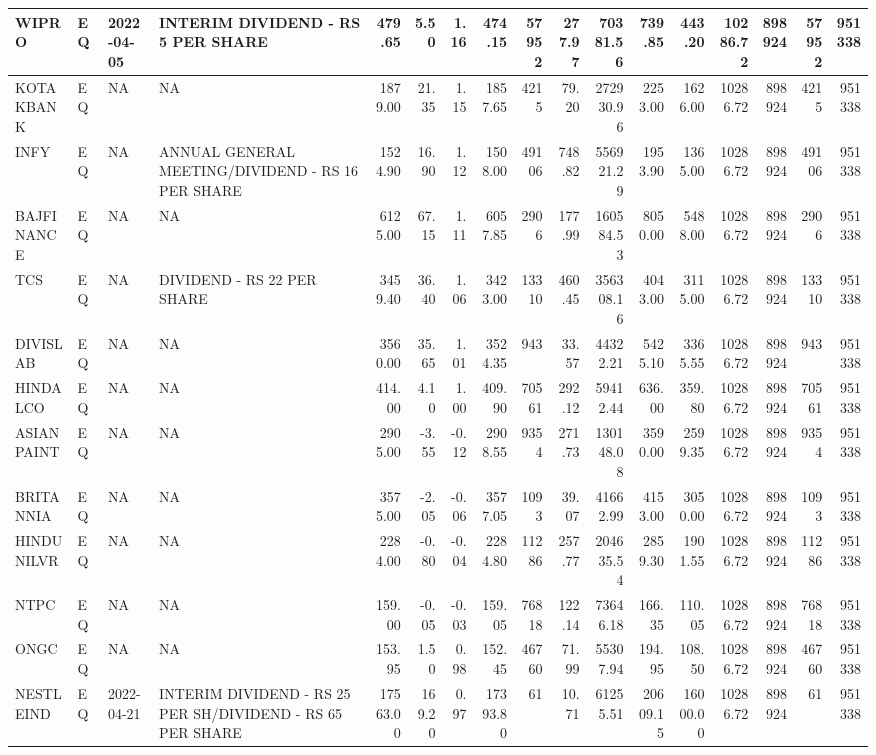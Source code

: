 \documentclass[
]{article}
\begin{document}
\begin{table}
\begin{tabular}{l|l|l|l|r|r|r|r|r|r|r|r|r|r|r|r|r}
\hline
WIPRO & EQ & 2022-04-05 & INTERIM DIVIDEND - RS 5 PER SHARE & 479.65 & 5.50 & 1.16 & 474.15 & 57952 & 277.97 & 70381.56 & 739.85 & 443.20 & 10286.72 & 898924 & 57952 & 951338\\
\hline
KOTAKBANK & EQ & NA & NA & 1879.00 & 21.35 & 1.15 & 1857.65 & 4215 & 79.20 & 272930.96 & 2253.00 & 1626.00 & 10286.72 & 898924 & 4215 & 951338\\
\hline
INFY & EQ & NA & ANNUAL GENERAL MEETING/DIVIDEND - RS 16 PER SHARE & 1524.90 & 16.90 & 1.12 & 1508.00 & 49106 & 748.82 & 556921.29 & 1953.90 & 1365.00 & 10286.72 & 898924 & 49106 & 951338\\
\hline
BAJFINANCE & EQ & NA & NA & 6125.00 & 67.15 & 1.11 & 6057.85 & 2906 & 177.99 & 160584.53 & 8050.00 & 5488.00 & 10286.72 & 898924 & 2906 & 951338\\
\hline
TCS & EQ & NA & DIVIDEND - RS 22 PER SHARE & 3459.40 & 36.40 & 1.06 & 3423.00 & 13310 & 460.45 & 356308.16 & 4043.00 & 3115.00 & 10286.72 & 898924 & 13310 & 951338\\
\hline
DIVISLAB & EQ & NA & NA & 3560.00 & 35.65 & 1.01 & 3524.35 & 943 & 33.57 & 44322.21 & 5425.10 & 3365.55 & 10286.72 & 898924 & 943 & 951338\\
\hline
HINDALCO & EQ & NA & NA & 414.00 & 4.10 & 1.00 & 409.90 & 70561 & 292.12 & 59412.44 & 636.00 & 359.80 & 10286.72 & 898924 & 70561 & 951338\\
\hline
ASIANPAINT & EQ & NA & NA & 2905.00 & -3.55 & -0.12 & 2908.55 & 9354 & 271.73 & 130148.08 & 3590.00 & 2599.35 & 10286.72 & 898924 & 9354 & 951338\\
\hline
BRITANNIA & EQ & NA & NA & 3575.00 & -2.05 & -0.06 & 3577.05 & 1093 & 39.07 & 41662.99 & 4153.00 & 3050.00 & 10286.72 & 898924 & 1093 & 951338\\
\hline
HINDUNILVR & EQ & NA & NA & 2284.00 & -0.80 & -0.04 & 2284.80 & 11286 & 257.77 & 204635.54 & 2859.30 & 1901.55 & 10286.72 & 898924 & 11286 & 951338\\
\hline
NTPC & EQ & NA & NA & 159.00 & -0.05 & -0.03 & 159.05 & 76818 & 122.14 & 73646.18 & 166.35 & 110.05 & 10286.72 & 898924 & 76818 & 951338\\
\hline
ONGC & EQ & NA & NA & 153.95 & 1.50 & 0.98 & 152.45 & 46760 & 71.99 & 55307.94 & 194.95 & 108.50 & 10286.72 & 898924 & 46760 & 951338\\
\hline
NESTLEIND & EQ & 2022-04-21 & INTERIM DIVIDEND - RS 25 PER SH/DIVIDEND - RS 65 PER SHARE & 17563.00 & 169.20 & 0.97 & 17393.80 & 61 & 10.71 & 61255.51 & 20609.15 & 16000.00 & 10286.72 & 898924 & 61 & 951338\\

\end{tabular}
\end{table}
\end{document}
